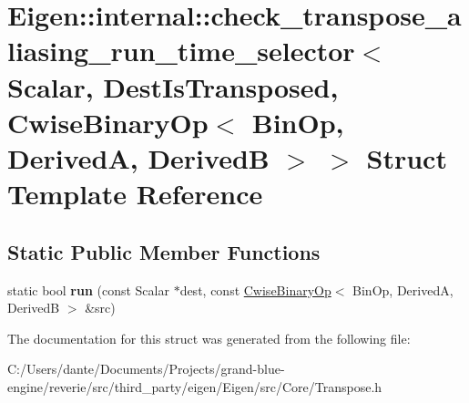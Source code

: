 \hypertarget{struct_eigen_1_1internal_1_1check__transpose__aliasing__run__time__selector_3_01_scalar_00_01_de23c75dd073d34cd03e0a4d86706317fc}{}\section{Eigen\+::internal\+::check\+\_\+transpose\+\_\+aliasing\+\_\+run\+\_\+time\+\_\+selector$<$ Scalar, Dest\+Is\+Transposed, Cwise\+Binary\+Op$<$ Bin\+Op, DerivedA, DerivedB $>$ $>$ Struct Template Reference}
\label{struct_eigen_1_1internal_1_1check__transpose__aliasing__run__time__selector_3_01_scalar_00_01_de23c75dd073d34cd03e0a4d86706317fc}
\subsection*{Static Public Member Functions}
\begin{DoxyCompactItemize}
\item 
\mbox{\label{struct_eigen_1_1internal_1_1check__transpose__aliasing__run__time__selector_3_01_scalar_00_01_de23c75dd073d34cd03e0a4d86706317fc_ae6e2eebec28efcb71ed43e9c1fe1d49c}} 
static bool {\bfseries run} (const Scalar $\ast$dest, const \mbox{\hyperlink{class_eigen_1_1_cwise_binary_op}{Cwise\+Binary\+Op}}$<$ Bin\+Op, DerivedA, DerivedB $>$ \&src)
\end{DoxyCompactItemize}


The documentation for this struct was generated from the following file\+:\begin{DoxyCompactItemize}
\item 
C\+:/\+Users/dante/\+Documents/\+Projects/grand-\/blue-\/engine/reverie/src/third\+\_\+party/eigen/\+Eigen/src/\+Core/Transpose.\+h\end{DoxyCompactItemize}
